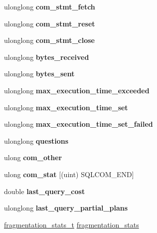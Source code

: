 \begin{DoxyCompactItemize}
ulonglong {\bfseries com\+\_\+stmt\+\_\+fetch}
\item 
\mbox{\label{structsystem__status__var_aff9bfb0d0f23ab0f1ccf262b04524132}} 
ulonglong {\bfseries com\+\_\+stmt\+\_\+reset}
\item 
\mbox{\label{structsystem__status__var_a98675f10da330aae6d14e0c98321369c}} 
ulonglong {\bfseries com\+\_\+stmt\+\_\+close}
\item 
\mbox{\label{structsystem__status__var_ad81039bfdf29dc2c44c43a478f29fcc4}} 
ulonglong {\bfseries bytes\+\_\+received}
\item 
\mbox{\label{structsystem__status__var_a6c37b094914af6d8f5718adbb4f1eebf}} 
ulonglong {\bfseries bytes\+\_\+sent}
\item 
\mbox{\label{structsystem__status__var_a929e5e1d0ec9fb01dc99a5317b89bca5}} 
ulonglong {\bfseries max\+\_\+execution\+\_\+time\+\_\+exceeded}
\item 
\mbox{\label{structsystem__status__var_af16dd74f9ef46c3e7cb41268606de8c0}} 
ulonglong {\bfseries max\+\_\+execution\+\_\+time\+\_\+set}
\item 
\mbox{\label{structsystem__status__var_a2b9afa7816fba278f340e82aed1429f5}} 
ulonglong {\bfseries max\+\_\+execution\+\_\+time\+\_\+set\+\_\+failed}
\item 
\mbox{\label{structsystem__status__var_a46af5489d6e26293e942f5938a051f6c}} 
ulonglong {\bfseries questions}
\item 
\mbox{\label{structsystem__status__var_aa172a357029ab8325ed9558a1f261437}} 
ulong {\bfseries com\+\_\+other}
\item 
\mbox{\label{structsystem__status__var_a753c1b2c1993746e853ec29d8c7ba42c}} 
ulong {\bfseries com\+\_\+stat} \mbox{[}(uint) S\+Q\+L\+C\+O\+M\+\_\+\+E\+ND\mbox{]}
\item 
\mbox{\label{structsystem__status__var_ab2cc1a43114e8b9a47683394a117e09a}} 
double {\bfseries last\+\_\+query\+\_\+cost}
\item 
\mbox{\label{structsystem__status__var_a1f6dd5edd2d4d150a396e689e6d673ed}} 
ulonglong {\bfseries last\+\_\+query\+\_\+partial\+\_\+plans}
\item 
\mbox{\hyperlink{structfragmentation__stats__t}{fragmentation\+\_\+stats\+\_\+t}} \mbox{\hyperlink{structsystem__status__var_a67fdfd830fe0d78072c0fdd2c6106ad4}{fragmentation\+\_\+stats}}
\end{DoxyCompactItemize}


